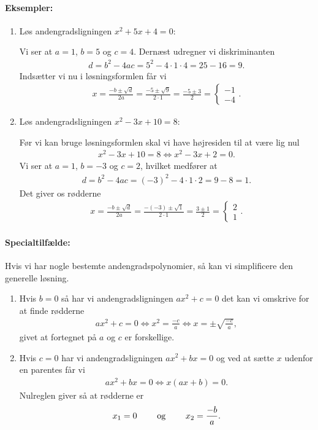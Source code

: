 \paragraph*{Eksempler:}
\begin{enumerate}
\item Løs andengradsligningen $x^2+5x+4 = 0$:

Vi ser at $a=1$, $b=5$ og $c=4$. Dernæst udregner vi diskriminanten
\begin{align*}
d=b^2-4ac = 5^2-4\cdot 1 \cdot 4 = 25-16=9.
\end{align*}
Indsætter vi nu i løsningsformlen får vi
\begin{align*}
x=\frac{-b\pm\sqrt{d}}{2a} = \frac{-5\pm \sqrt{9}}{2 \cdot 1} = \frac{-5 \pm 3}{2} = \begin{cases} -1 \\
-4
\end{cases}.
\end{align*}
\item Løs andengradsligningen $x^2-3x+10=8$:

Før vi kan bruge løsningsformlen skal vi have højresiden til at være lig nul
\begin{align*}
x^2-3x+10=8 \Leftrightarrow x^2-3x +2 = 0.
\end{align*}
Vi ser at $a=1$, $b=-3$ og $c=2$, hvilket medfører at
\begin{align*}
d = b^2-4ac = (-3)^2 - 4 \cdot 1 \cdot 2 = 9-8 =1.
\end{align*}
Det giver os rødderne
\begin{align*}
x=\frac{-b \pm \sqrt{d}}{2a} = \frac{-(-3) \pm \sqrt{1}}{2 \cdot 1} = \frac{3 \pm 1}{2} =  \begin{cases} 2 \\
1
\end{cases}.
\end{align*}
\end{enumerate}


\paragraph*{Specialtilfælde:}
Hvis vi har nogle bestemte andengradspolynomier, så kan vi simplificere den generelle løsning.
\begin{enumerate}
\item Hvis $b=0$ så har vi andengradsligningen $ax^2+c=0$ det kan vi omskrive for at finde rødderne
\begin{align*}
ax^2+c=0 \Leftrightarrow x^2 = \frac{-c}{a} \Leftrightarrow x = \pm \sqrt{\frac{-c}{a}},
\end{align*}
givet at fortegnet på $a$ og $c$ er forskellige.
\item Hvis $c=0$ har vi andengradsligningen $ax^2+bx = 0$ og ved at sætte $x$ udenfor en parentes får vi
\begin{align*}
ax^2+bx = 0 \Leftrightarrow x(ax+b)=0.
\end{align*}
Nulreglen giver så at rødderne er
\begin{align*}
x_1=0 \qquad \textup{ og } \qquad x_2= \frac{-b}{a}.
\end{align*}
\end{enumerate}

